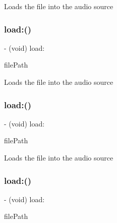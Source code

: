 Loads the file into the audio source \mbox{\label{interfaceCDLongAudioSource_a50cff2f77f96cf9a2655d5e18af9f225}} 
\subsubsection{\texorpdfstring{load\+:()}{load:()}\hspace{0.1cm}{\footnotesize\ttfamily [2/4]}}
{\footnotesize\ttfamily -\/ (void) load\+: \begin{DoxyParamCaption}\item[{(N\+S\+String $\ast$)}]{file\+Path }\end{DoxyParamCaption}}

Loads the file into the audio source \mbox{\label{interfaceCDLongAudioSource_a50cff2f77f96cf9a2655d5e18af9f225}} 
\subsubsection{\texorpdfstring{load\+:()}{load:()}\hspace{0.1cm}{\footnotesize\ttfamily [3/4]}}
{\footnotesize\ttfamily -\/ (void) load\+: \begin{DoxyParamCaption}\item[{(N\+S\+String$\ast$)}]{file\+Path }\end{DoxyParamCaption}}

Loads the file into the audio source \mbox{\label{interfaceCDLongAudioSource_a50cff2f77f96cf9a2655d5e18af9f225}} 
\subsubsection{\texorpdfstring{load\+:()}{load:()}\hspace{0.1cm}{\footnotesize\ttfamily [4/4]}}
{\footnotesize\ttfamily -\/ (void) load\+: \begin{DoxyParamCaption}\item[{(N\+S\+String $\ast$)}]{file\+Path }\end{DoxyParamCaption}}

